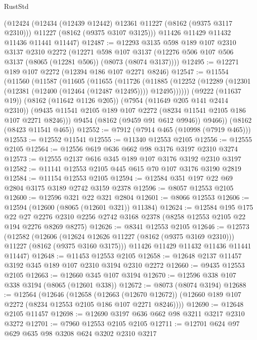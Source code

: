 \begin{lexlean}{RustStd}
\begin{coremodule}
      (@12424
        (@12434 (@12439 @12442) @12361 @11227 (@8162 (@9375 @3117 @2310)))
        @11227
        (@8162 (@9375 @3107 @3125)))
      @11426
      @11429
      @11432
      @11436
      @11441
      @11447)
@12487 := @12293
    @3135
    @598
    @189
    @107
    @2310
    @3137
    @2310
    @2272
    (@12271
      @598
      @107
      @3137
      (@12276 @506 @107 @506 @3137 (@8065 (@12281 @506)) (@8073 (@8074 @3137))))
@12495 := @12271 @189 @107 @2272 (@12394 @186 @107 @2271 @8246)
@12547 := @11554
    (@11560
      (@11587
        (@11605
          (@11655
            (@11726
              (@11885
                (@12252 (@12289 (@12301 (@12381 (@12400 (@12464 (@12487 @12495)))) @12495))))))
          (@9222 (@11637 @19))
          (@8162 (@11642 @1126 @205))
          (@7954 (@11649 @205 @141 @2414 @2310))
          (@9435 @11541 @2105 @189 @107 @2272 (@8234 @11541 @2105 @186 @107 @2271 @8246)))
        @9454
        (@8162 (@9459 @91 @612 @9946))
        @9466))
    (@8162 (@8423 @11541 @465))
@12552 := @7912 (@7914 @465 (@10998 (@7919 @465)))
@12553 := @12552 @11541
@12555 := @11340 @12553 @2105
@12556 := @12555 @2105
@12564 := @12556 @619 @636 @662 @98 @3176 @3197 @2310 @3274
@12573 := @12555 @2137 @616 @345 @189 @107 @3176 @3192 @2310 @3197
@12582 := @11141 @12553 @2105 @445 @615 @70 @107 @3176 @3190 @2819
@12584 := @11154 @12553 @2105
@12594 := @12584 @351 @197 @22 @69 @2804 @3175 @3189 @2742 @3159 @2378
@12596 := @8057 @12553 @2105
@12600 := @12596 @321 @22 @321 @2804
@12601 := @8066 @12553
@12606 := @12594 (@12600 (@8065 (@12601 @321)) @11384)
@12624 := @12584
    @195
    @175
    @22
    @27
    @2276
    @2310
    @2256
    @2742
    @3168
    @2378
    (@8258 @12553 @2105 @22 @194 @2276 @8269 @8275)
@12626 := @8341 @12553 @2105
@12646 := @12573
    (@12582
      (@12606 (@12624 @12626 @11227 (@8162 (@9375 @3169 @2310))) @11227 (@8162 (@9375 @3160 @3175)))
      @11426
      @11429
      @11432
      @11436
      @11441
      @11447)
@12648 := @11453 @12553 @2105
@12658 := @12648 @2137 @11457 @3192 @345 @189 @107 @2310 @3194 @2310 @2272
@12660 := @9435 @12553 @2105
@12663 := @12660 @345 @107 @3194
@12670 := @12596 @338 @107 @338 @3194 (@8065 (@12601 @338))
@12672 := @8073 (@8074 @3194)
@12688 := @12564
    (@12646
      (@12658
        (@12663 (@12670 @12672))
        (@12660 @189 @107 @2272 (@8234 @12553 @2105 @186 @107 @2271 @8246))))
@12690 := @12648 @2105 @11457
@12698 := @12690 @3197 @636 @662 @98 @3211 @3217 @2310 @3272
@12701 := @7960 @12553 @2105 @2105
@12711 := @12701 @624 @97 @629 @635 @98 @3208 @624 @3202 @2310 @3217

\end{coremodule}
\end{lexlean}
